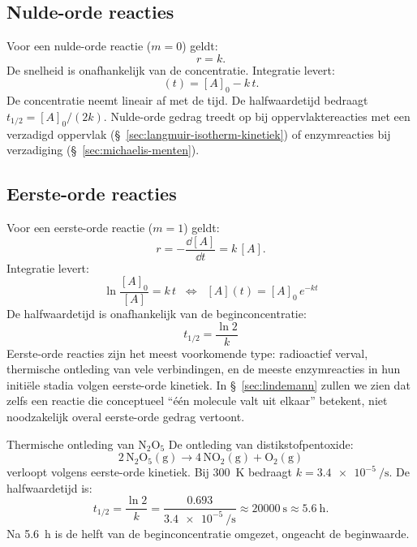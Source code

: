 \subsection{Nulde-orde reacties}

Voor een nulde-orde reactie ($m=0$) geldt:
\begin{equation}
r = k.
\end{equation}
De snelheid is onafhankelijk van de concentratie. Integratie levert:
\begin{equation}
[A](t) = [A]_0 - k\,t.
\label{eq:nulde-orde}
\end{equation}
De concentratie neemt lineair af met de tijd. De halfwaardetijd bedraagt $t_{1/2} = [A]_0/(2k)$. Nulde-orde gedrag treedt op bij oppervlaktereacties met een verzadigd oppervlak (\S~\ref{sec:langmuir-isotherm-kinetiek}) of enzymreacties bij verzadiging (\S~\ref{sec:michaelis-menten}).

\subsection{Eerste-orde reacties}

Voor een eerste-orde reactie ($m=1$) geldt:
\begin{equation}
r = -\frac{\dd{[A]}}{\dd{t}} = k\,[A].
\end{equation}
Integratie levert:
\begin{equation}
\boxed{\;\ln\frac{[A]_0}{[A]} = k\,t \;\;\Leftrightarrow\;\; [A](t) = [A]_0\,e^{-kt}\;}
\label{eq:eerste-orde}
\end{equation}
De halfwaardetijd is onafhankelijk van de beginconcentratie:
\begin{equation}
\boxed{\;t_{1/2} = \frac{\ln 2}{k}\;}
\end{equation}
Eerste-orde reacties zijn het meest voorkomende type: radioactief verval, thermische ontleding van vele verbindingen, en de meeste enzymreacties in hun initi\"ele stadia volgen eerste-orde kinetiek. In \S~\ref{sec:lindemann} zullen we zien dat zelfs een reactie die conceptueel ``\'e\'en molecule valt uit elkaar'' betekent, niet noodzakelijk overal eerste-orde gedrag vertoont.

\begin{voorbeeld}{Thermische ontleding van $\mathrm{N_2O_5}$}
De ontleding van distikstofpentoxide:
\[
\mathrm{2\,N_2O_5(g) \rightarrow 4\,NO_2(g) + O_2(g)}
\]
verloopt volgens eerste-orde kinetiek. Bij \SI{300}{\kelvin} bedraagt $k = \SI{3.4e-5}{\per\second}$. De halfwaardetijd is:
\[
t_{1/2} = \frac{\ln 2}{k} = \frac{0.693}{\SI{3.4e-5}{\per\second}} \approx \SI{20000}{\second} \approx \SI{5.6}{\hour}.
\]
Na \SI{5.6}{\hour} is de helft van de beginconcentratie omgezet, ongeacht de beginwaarde.
\end{voorbeeld}

